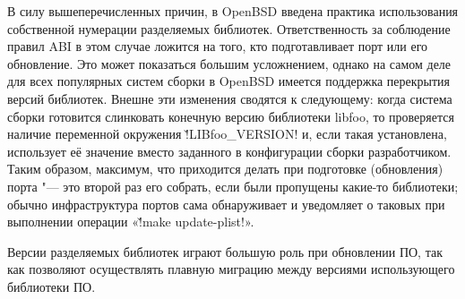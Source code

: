 \documentclass[10pt, a5paper]{article}
\begin{document}
В силу вышеперечисленных причин, в OpenBSD введена практика использования собственной нумерации разделяемых библиотек. Ответственность за соблюдение правил ABI в этом случае ложится на того, кто подготавливает порт или его обновление. Это может показаться большим усложнением, однако на самом деле для всех популярных систем сборки в OpenBSD имеется поддержка перекрытия версий библиотек. Внешне эти изменения сводятся к следующему: когда система сборки готовится слинковать конечную версию библиотеки libfoo, то проверяется наличие переменной окружения \v!LIBfoo\_VERSION! и, если такая установлена, использует её значение вместо заданного в конфигурации сборки разработчиком. Таким образом, максимум, что приходится делать при подготовке (обновления) порта "--- это второй раз его собрать, если были пропущены какие-то библиотеки; обычно инфраструктура портов сама обнаруживает и уведомляет о таковых при выполнении операции «\v!make update-plist!».

Версии разделяемых библиотек играют большую роль при обновлении ПО, так как позволяют осуществлять плавную миграцию между версиями использующего библиотеки ПО.
\end{document}
